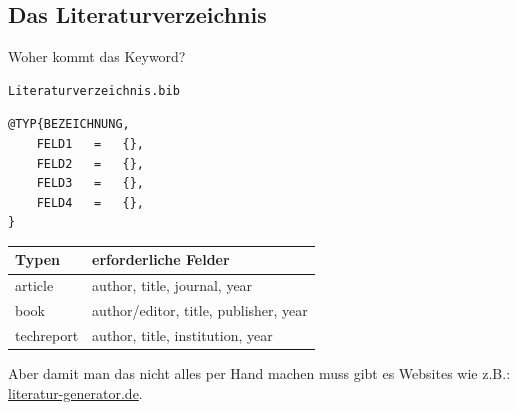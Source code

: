 \documentclass["WS\space 16-17\space -\space LaTeX-Kurs\space -\space Praesentation\space -\space 3.tex"]{subfiles}
\begin{document}
\subsection{Das Literaturverzeichnis}
\begin{frame}{Woher kommt das Keyword?}
  
\end{frame}
\begin{frame}[fragile]
	\begin{lstlisting}
Literaturverzeichnis.bib
	\end{lstlisting}
	\begin{lstlisting}
@TYP{BEZEICHNUNG,
	FELD1	=	{},
	FELD2	=	{},
	FELD3	=	{},
	FELD4	=	{},
}
	\end{lstlisting}
	\begin{center}
		\begin{tabular}{ll}
			\toprule					
			Typen			&	erforderliche Felder						\\ \midrule
			article			&	author, title, journal, year				\\	
			book			&	author/editor, title, publisher, year		\\
			techreport		&	author, title, institution, year			\\
			\bottomrule
		\end{tabular}
	\end{center}
	\vspace{0.1cm}
\end{frame}
\begin{frame}
	Aber damit man das nicht alles per Hand machen muss gibt es Websites wie z.B.:
	\href{http://literatur-generator.de}{\textrm{literatur-generator.de}}.
\end{frame}
\end{document}
